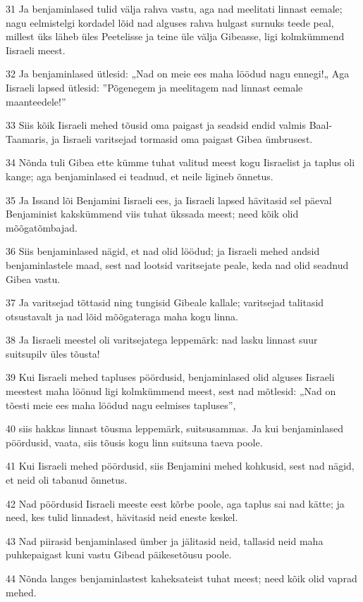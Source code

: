 \par 31 Ja benjaminlased tulid välja rahva vastu, aga nad meelitati linnast eemale; nagu eelmistelgi kordadel lõid nad alguses rahva hulgast surnuks teede peal, millest üks läheb üles Peetelisse ja teine üle välja Gibeasse, ligi kolmkümmend Iisraeli meest.
\par 32 Ja benjaminlased ütlesid: „Nad on meie ees maha löödud nagu ennegi!„ Aga Iisraeli lapsed ütlesid: ”Põgenegem ja meelitagem nad linnast eemale maanteedele!”
\par 33 Siis kõik Iisraeli mehed tõusid oma paigast ja seadsid endid valmis Baal-Taamaris, ja Iisraeli varitsejad tormasid oma paigast Gibea ümbrusest.
\par 34 Nõnda tuli Gibea ette kümme tuhat valitud meest kogu Iisraelist ja taplus oli kange; aga benjaminlased ei teadnud, et neile ligineb õnnetus.
\par 35 Ja Issand lõi Benjamini Iisraeli ees, ja Iisraeli lapsed hävitasid sel päeval Benjaminist kakskümmend viis tuhat ükssada meest; need kõik olid mõõgatõmbajad.
\par 36 Siis benjaminlased nägid, et nad olid löödud; ja Iisraeli mehed andsid benjaminlastele maad, sest nad lootsid varitsejate peale, keda nad olid seadnud Gibea vastu.
\par 37 Ja varitsejad tõttasid ning tungisid Gibeale kallale; varitsejad talitasid otsustavalt ja nad lõid mõõgateraga maha kogu linna.
\par 38 Ja Iisraeli meestel oli varitsejatega leppemärk: nad lasku linnast suur suitsupilv üles tõusta!
\par 39 Kui Iisraeli mehed tapluses pöördusid, benjaminlased olid alguses Iisraeli meestest maha löönud ligi kolmkümmend meest, sest nad mõtlesid: „Nad on tõesti meie ees maha löödud nagu eelmises tapluses”,
\par 40 siis hakkas linnast tõusma leppemärk, suitsusammas. Ja kui benjaminlased pöördusid, vaata, siis tõusis kogu linn suitsuna taeva poole.
\par 41 Kui Iisraeli mehed pöördusid, siis Benjamini mehed kohkusid, sest nad nägid, et neid oli tabanud õnnetus.
\par 42 Nad pöördusid Iisraeli meeste eest kõrbe poole, aga taplus sai nad kätte; ja need, kes tulid linnadest, hävitasid neid eneste keskel.
\par 43 Nad piirasid benjaminlased ümber ja jälitasid neid, tallasid neid maha puhkepaigast kuni vastu Gibead päikesetõusu poole.
\par 44 Nõnda langes benjaminlastest kaheksateist tuhat meest; need kõik olid vaprad mehed.
